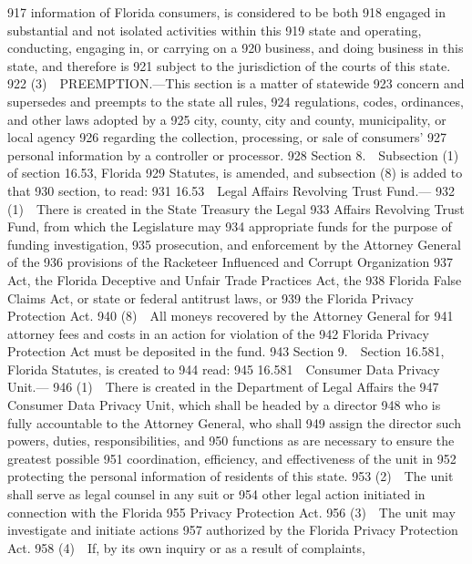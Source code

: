   917  information of Florida consumers, is considered to be both
  918  engaged in substantial and not isolated activities within this
  919  state and operating, conducting, engaging in, or carrying on a
  920  business, and doing business in this state, and therefore is
  921  subject to the jurisdiction of the courts of this state.
  922         (3) PREEMPTION.—This section is a matter of statewide
  923  concern and supersedes and preempts to the state all rules,
  924  regulations, codes, ordinances, and other laws adopted by a
  925  city, county, city and county, municipality, or local agency
  926  regarding the collection, processing, or sale of consumers’
  927  personal information by a controller or processor.
  928         Section 8. Subsection (1) of section 16.53, Florida
  929  Statutes, is amended, and subsection (8) is added to that
  930  section, to read:
  931         16.53 Legal Affairs Revolving Trust Fund.—
  932         (1) There is created in the State Treasury the Legal
  933  Affairs Revolving Trust Fund, from which the Legislature may
  934  appropriate funds for the purpose of funding investigation,
  935  prosecution, and enforcement by the Attorney General of the
  936  provisions of the Racketeer Influenced and Corrupt Organization
  937  Act, the Florida Deceptive and Unfair Trade Practices Act, the
  938  Florida False Claims Act, or state or federal antitrust laws, or
  939  the Florida Privacy Protection Act.
  940         (8) All moneys recovered by the Attorney General for
  941  attorney fees and costs in an action for violation of the
  942  Florida Privacy Protection Act must be deposited in the fund.
  943         Section 9. Section 16.581, Florida Statutes, is created to
  944  read:
  945         16.581 Consumer Data Privacy Unit.—
  946         (1) There is created in the Department of Legal Affairs the
  947  Consumer Data Privacy Unit, which shall be headed by a director
  948  who is fully accountable to the Attorney General, who shall
  949  assign the director such powers, duties, responsibilities, and
  950  functions as are necessary to ensure the greatest possible
  951  coordination, efficiency, and effectiveness of the unit in
  952  protecting the personal information of residents of this state.
  953         (2) The unit shall serve as legal counsel in any suit or
  954  other legal action initiated in connection with the Florida
  955  Privacy Protection Act.
  956         (3) The unit may investigate and initiate actions
  957  authorized by the Florida Privacy Protection Act.
  958         (4) If, by its own inquiry or as a result of complaints,
